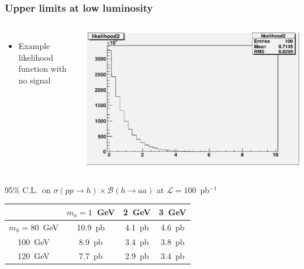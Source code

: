 \documentclass[compress]{beamer}
\begin{document}
\begin{frame}
\frametitle{Upper limits at low luminosity}

\vspace{0.5 cm}
\begin{columns}
\begin{itemize}
\item Example likelihood function with no signal
\end{itemize}

\includegraphics[width=\linewidth]{likelihood_NoSignal.pdf}
\end{columns}

\vspace{0.25 cm}
\begin{center}
95\% C.L.\ on $\sigma(pp \to h) \times \mathcal{B}(h \to aa)$ at $\mathcal{L} = 100$~pb$^{-1}$

\vspace{0.25 cm}
\renewcommand{\arraystretch}{1.5}
\begin{tabular}{c | c c c}
& $m_a = 1$~GeV & \mbox{\hspace{0.25 cm}}2~GeV\mbox{\hspace{0.25 cm}} & \mbox{\hspace{0.25 cm}}3~GeV\mbox{\hspace{0.25 cm}} \\\hline
$m_h = 80$~GeV & 10.9~pb & 4.1~pb & 4.6~pb \\
100~GeV & 8.9~pb & 3.4~pb & 3.8~pb \\
120~GeV & 7.7~pb & 2.9~pb & 3.4~pb \\
\end{tabular}
\end{center}
\end{frame}
\end{document}
